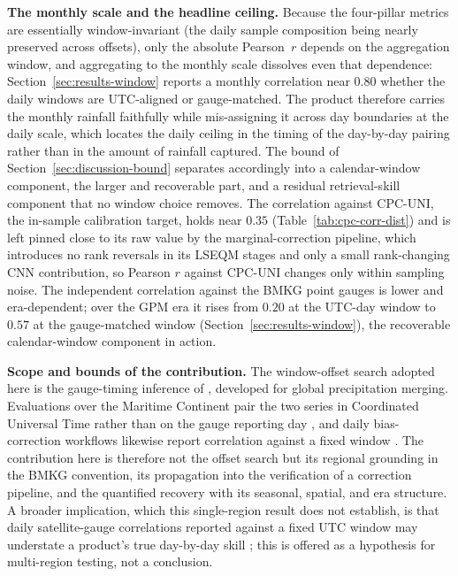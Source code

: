 \textbf{The monthly scale and the headline ceiling.} Because the
four-pillar metrics are essentially window-invariant (the daily
sample composition being nearly preserved across offsets), only the
absolute Pearson~$r$ depends on the aggregation window, and
aggregating to the monthly scale dissolves even that dependence:
Section~\ref{sec:results-window} reports a monthly correlation near
$0.80$ whether the daily windows are UTC-aligned or gauge-matched.
The product therefore carries the monthly rainfall faithfully while
mis-assigning it across day boundaries at the daily scale, which
locates the daily ceiling in the timing of the day-by-day pairing
rather than in the amount of rainfall captured. The bound of
Section~\ref{sec:discussion-bound} separates accordingly into a
calendar-window component, the larger and recoverable part, and a
residual retrieval-skill component that no window choice removes.
The correlation against CPC-UNI, the in-sample calibration target,
holds near $0.35$ (Table~\ref{tab:cpc-corr-dist}) and is left
pinned close to its raw value by the marginal-correction pipeline, which
introduces no rank reversals in its LSEQM stages and only a small
rank-changing CNN contribution, so Pearson $r$ against CPC-UNI
changes only within sampling noise. The independent correlation
against the BMKG point gauges is lower and era-dependent; over the
GPM era it rises from $0.20$ at the UTC-day window to $0.57$ at the
gauge-matched window (Section~\ref{sec:results-window}), the
recoverable calendar-window component in action.

\textbf{Scope and bounds of the contribution.} The window-offset
search adopted here is the gauge-timing inference
of \citet{ref:beck2019}, developed for global precipitation
merging. Evaluations over the Maritime Continent pair the two
series in Coordinated Universal Time rather than on the gauge
reporting day \citep{ref:ramadhan2022ts}, and daily
bias-correction workflows likewise report correlation
against a fixed window \citep{ref:ramadhan2024sumatra, ref:suhartanto2025}. The contribution here is therefore not
the offset search but its regional grounding in the BMKG
convention, its propagation into the verification of a correction
pipeline, and the quantified recovery with its seasonal, spatial,
and era structure. A broader implication, which this single-region
result does not establish, is that daily satellite-gauge
correlations reported against a fixed UTC window may understate a
product's true day-by-day skill \citep{ref:tang2020,
ref:ramadhan2022ts}; this is offered as a hypothesis for
multi-region testing, not a conclusion.

